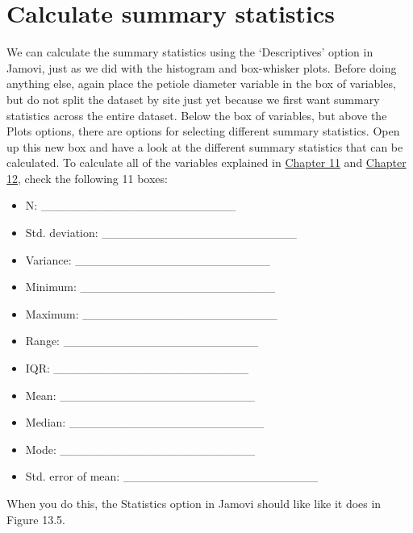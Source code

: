 \documentclass[
]{scrbook}
\providecommand{\tightlist}{%
  \setlength{\itemsep}{0pt}\setlength{\parskip}{0pt}}
\begin{document}
\hypertarget{calculate-summary-statistics}{%
\section{Calculate summary statistics}\label{calculate-summary-statistics}}

We can calculate the summary statistics using the `Descriptives' option in Jamovi, just as we did with the histogram and box-whisker plots.
Before doing anything else, again place the petiole diameter variable in the box of variables, but do not split the dataset by site just yet because we first want summary statistics across the entire dataset.
Below the box of variables, but above the Plots options, there are options for selecting different summary statistics.
Open up this new box and have a look at the different summary statistics that can be calculated.
To calculate all of the variables explained in \protect\hyperlink{Chapter_11}{Chapter 11} and \protect\hyperlink{Chapter_11}{Chapter 12}, check the following 11 boxes:

\begin{itemize}
\tightlist
\item
  N: \_\_\_\_\_\_\_\_\_\_\_\_\_\_\_\_\_\_\_\_\_\_\_
\item
  Std. deviation: \_\_\_\_\_\_\_\_\_\_\_\_\_\_\_\_\_\_\_\_\_\_\_
\item
  Variance: \_\_\_\_\_\_\_\_\_\_\_\_\_\_\_\_\_\_\_\_\_\_\_
\item
  Minimum: \_\_\_\_\_\_\_\_\_\_\_\_\_\_\_\_\_\_\_\_\_\_\_
\item
  Maximum: \_\_\_\_\_\_\_\_\_\_\_\_\_\_\_\_\_\_\_\_\_\_\_
\item
  Range: \_\_\_\_\_\_\_\_\_\_\_\_\_\_\_\_\_\_\_\_\_\_\_
\item
  IQR: \_\_\_\_\_\_\_\_\_\_\_\_\_\_\_\_\_\_\_\_\_\_\_
\item
  Mean: \_\_\_\_\_\_\_\_\_\_\_\_\_\_\_\_\_\_\_\_\_\_\_
\item
  Median: \_\_\_\_\_\_\_\_\_\_\_\_\_\_\_\_\_\_\_\_\_\_\_
\item
  Mode: \_\_\_\_\_\_\_\_\_\_\_\_\_\_\_\_\_\_\_\_\_\_\_
\item
  Std. error of mean: \_\_\_\_\_\_\_\_\_\_\_\_\_\_\_\_\_\_\_\_\_\_\_
\end{itemize}

When you do this, the Statistics option in Jamovi should like like it does in Figure 13.5.
\end{document}
